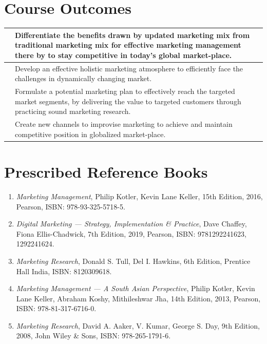 \section*{Course Outcomes}

\vspace{4pt}

{\sffamily\small
\begin{longtable}{@{}P{0.07\textwidth}P{0.89\textwidth}@{}}
\toprule[1.1pt]
 & Differentiate the benefits drawn by updated marketing mix from
traditional marketing mix for effective marketing management there by to stay
competitive in today's global market-place.\\
\midrule
{} & Develop an effective holistic marketing atmosphere to efficiently
face the challenges in dynamically changing market.\\
\midrule
{} & Formulate a potential marketing plan to effectively reach the
targeted market segments, by delivering the value to targeted customers through
practicing sound marketing research.\\
\midrule
{} & Create new channels to improvise marketing to achieve and maintain
competitive position in globalized market-place.\\
\bottomrule[1.1pt]
\end{longtable}}

\section*{Prescribed Reference Books}

{\small
\begin{enumerate}[leftmargin=2.1em]
\item \textit{Marketing Management}, Philip Kotler, Kevin Lane Keller, 15th
      Edition, 2016, Pearson, ISBN: 978-93-325-5718-5.
\item \textit{Digital Marketing --- Strategy, Implementation \& Practice}, Dave
      Chaffey, Fiona Ellis-Chadwick, 7th Edition, 2019, Pearson,
      ISBN: 9781292241623, 1292241624.
\item \textit{Marketing Research}, Donald S. Tull, Del I. Hawkins, 6th Edition,
      Prentice Hall India, ISBN: 8120309618.
\item \textit{Marketing Management --- A South Asian Perspective}, Philip
      Kotler, Kevin Lane Keller, Abraham Koshy, Mithileshwar Jha, 14th Edition,
      2013, Pearson, ISBN: 978-81-317-6716-0.
\item \textit{Marketing Research}, David A. Aaker, V. Kumar, George S. Day, 9th
      Edition, 2008, John Wiley \& Sons, ISBN: 978-265-1791-6.
\end{enumerate}}

